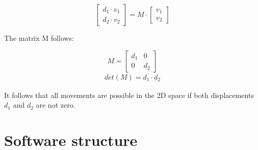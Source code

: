 \documentclass{article}
\begin{document}
	\[
	\begin{bmatrix}
	d_{1} \cdot v_1 \\
	d_{2} \cdot v_2 
	\end{bmatrix}
	= M \cdot \begin{bmatrix}
	v_1 \\
	v_2 
	\end{bmatrix}
	\]
	
	The matrix M follows: 
	
	\[
	M = 
	\begin{bmatrix}
	d_{1} & 0 \\
	0 & d_{2} 
	\end{bmatrix}
	\]
	\begin{align}
	det (M) = d_{1} \cdot d_{2}
	\end{align}
	
	It follows that all movements are possible in the 2D space if both displacements $d_{1}$ and $d_{2}$ are not zero.
	
	
	
	\section{Software structure}
\end{document}
